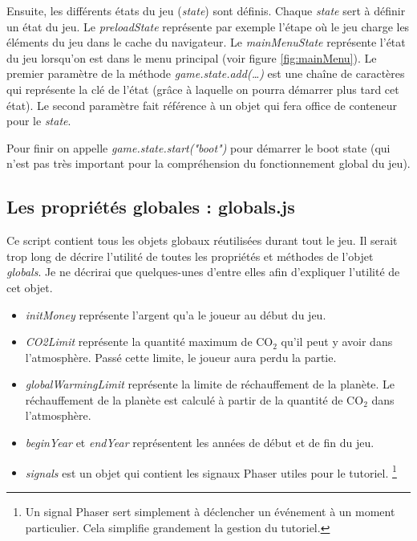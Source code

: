 \documentclass{article}
\begin{document}
		
		Ensuite, les différents états du jeu (\textit{state}) sont définis. Chaque \textit{state} sert à définir un état du jeu. Le \textit{preloadState} représente par exemple l'étape où le jeu charge les éléments du jeu dans le cache du navigateur.
		Le \textit{mainMenuState} représente l'état du jeu lorsqu'on est dans le menu principal (voir figure \ref{fig:mainMenu}).
		Le premier paramètre de la méthode \textit{game.state.add(\dots)} est une chaîne de caractères qui représente la clé de l'état (grâce à laquelle on pourra démarrer plus tard cet état). Le second paramètre fait référence à un objet qui fera office de conteneur pour le \textit{state}.
		
		
		Pour finir on appelle \textit{game.state.start("boot")} pour démarrer le boot state (qui n'est pas très important pour la compréhension du fonctionnement global du jeu).
		
		\subsection{Les propriétés globales : globals.js} \label{globals.js}
		
		Ce script contient tous les objets globaux réutilisées durant tout le jeu. Il serait trop long de décrire l'utilité de toutes les propriétés et méthodes de l'objet \textit{globals}. Je ne décrirai que quelques-unes d'entre elles afin d'expliquer l'utilité de cet objet.
		
		\begin{itemize}
			\item \textit{initMoney} représente l'argent qu'a le joueur au début du jeu.
			\item \textit{CO2Limit} représente la quantité maximum de CO$_{2}$ qu'il peut y avoir dans l'atmosphère. Passé cette limite, le joueur aura perdu la partie.
			\item \textit{globalWarmingLimit} représente la limite de réchauffement de la planète. Le réchauffement de la planète est calculé à partir de la quantité de CO$_{2}$ dans l'atmosphère.
			\item \textit{beginYear} et \textit{endYear} représentent les années de début et de fin du jeu.
			\item \textit{signals} est un objet qui contient les signaux Phaser utiles pour le tutoriel. \footnote{Un signal Phaser sert simplement à déclencher un événement à un moment particulier. Cela simplifie grandement la gestion du tutoriel.}
		\end{itemize}
		
\end{document}
